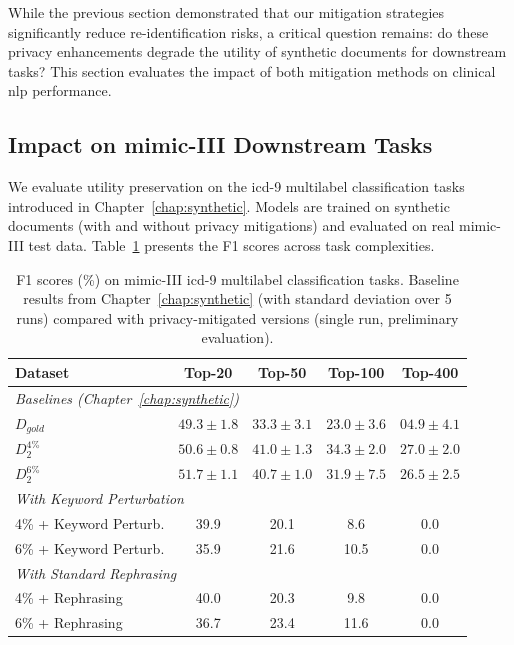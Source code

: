 While the previous section demonstrated that our mitigation strategies significantly reduce re-identification risks, a critical question remains: do these privacy enhancements degrade the utility of synthetic documents for downstream tasks? This section evaluates the impact of both mitigation methods on clinical \gls{nlp} performance.

\subsection{Impact on \gls{mimic}-III Downstream Tasks}
\label{subsec:mimic_utility}

We evaluate utility preservation on the \gls{icd}-9 multilabel classification tasks introduced in Chapter~\ref{chap:synthetic}. Models are trained on synthetic documents (with and without privacy mitigations) and evaluated on real \gls{mimic}-III test data. Table~\ref{tab:mimic_utility} presents the F1 scores across task complexities.

\begin{table}[h]
\centering
\begin{tabular}{lcccc}
\toprule
\textbf{Dataset} & \textbf{Top-20} & \textbf{Top-50} & \textbf{Top-100} & \textbf{Top-400} \\
\midrule
\multicolumn{5}{l}{\textit{Baselines (Chapter~\ref{chap:synthetic})}} \\
$D_{gold}$ & $49.3 \pm 1.8$ & $33.3 \pm 3.1$ & $23.0 \pm 3.6$ & $04.9 \pm 4.1$ \\
$D_{2}^{4\%}$ & $50.6 \pm 0.8$ & $41.0 \pm 1.3$ & $34.3 \pm 2.0$ & $27.0 \pm 2.0$ \\
$D_{2}^{6\%}$ & $51.7 \pm 1.1$ & $40.7 \pm 1.0$ & $31.9 \pm 7.5$ & $26.5 \pm 2.5$ \\
\midrule
\multicolumn{5}{l}{\textit{With Keyword Perturbation}} \\
4\% + Keyword Perturb. & 39.9 & 20.1 & 8.6 & 0.0 \\
6\% + Keyword Perturb. & 35.9 & 21.6 & 10.5 & 0.0 \\
\midrule
\multicolumn{5}{l}{\textit{With Standard Rephrasing}} \\
4\% + Rephrasing & 40.0 & 20.3 & 9.8 & 0.0 \\
6\% + Rephrasing & 36.7 & 23.4 & 11.6 & 0.0 \\
\bottomrule
\end{tabular}
\caption{F1 scores (\%) on \gls{mimic}-III \gls{icd}-9 multilabel classification tasks. Baseline results from Chapter~\ref{chap:synthetic} (with standard deviation over 5 runs) compared with privacy-mitigated versions (single run, preliminary evaluation).}
\label{tab:mimic_utility}
\end{table}

